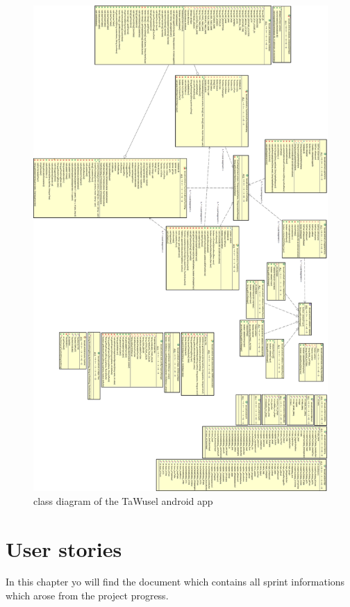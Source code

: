 \begin{figure}[ht]
	\centering
	\includegraphics[height=.9\textheight]{images/Tawuseldroid_class}
	\caption{class diagram of the TaWusel android app}
	\label{img:AndCl}
\end{figure}

\chapter{User stories}\label{chp:US}
In this chapter yo will find the document which contains all sprint informations which arose from the project progress.

\clearpage

